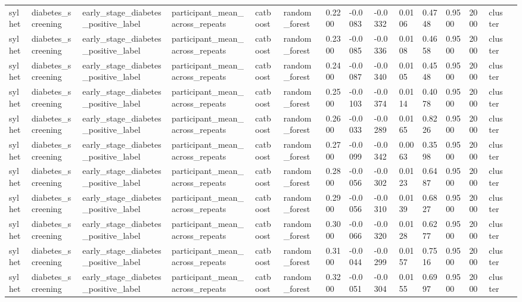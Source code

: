 \begin{tabular}{lllllllllllllll}
sylhet & diabetes\_screening & early\_stage\_diabetes\_positive\_label & participant\_mean\_across\_repeats & catboost & random\_forest & 0.2200 & -0.0083 & -0.0332 & 0.0106 & 0.4748 & 0.9500 & 2000 & cluster &  \\
sylhet & diabetes\_screening & early\_stage\_diabetes\_positive\_label & participant\_mean\_across\_repeats & catboost & random\_forest & 0.2300 & -0.0085 & -0.0336 & 0.0108 & 0.4658 & 0.9500 & 2000 & cluster &  \\
sylhet & diabetes\_screening & early\_stage\_diabetes\_positive\_label & participant\_mean\_across\_repeats & catboost & random\_forest & 0.2400 & -0.0087 & -0.0340 & 0.0105 & 0.4548 & 0.9500 & 2000 & cluster &  \\
sylhet & diabetes\_screening & early\_stage\_diabetes\_positive\_label & participant\_mean\_across\_repeats & catboost & random\_forest & 0.2500 & -0.0103 & -0.0374 & 0.0114 & 0.4078 & 0.9500 & 2000 & cluster &  \\
sylhet & diabetes\_screening & early\_stage\_diabetes\_positive\_label & participant\_mean\_across\_repeats & catboost & random\_forest & 0.2600 & -0.0033 & -0.0289 & 0.0165 & 0.8226 & 0.9500 & 2000 & cluster &  \\
sylhet & diabetes\_screening & early\_stage\_diabetes\_positive\_label & participant\_mean\_across\_repeats & catboost & random\_forest & 0.2700 & -0.0099 & -0.0342 & 0.0063 & 0.3598 & 0.9500 & 2000 & cluster &  \\
sylhet & diabetes\_screening & early\_stage\_diabetes\_positive\_label & participant\_mean\_across\_repeats & catboost & random\_forest & 0.2800 & -0.0056 & -0.0302 & 0.0123 & 0.6487 & 0.9500 & 2000 & cluster &  \\
sylhet & diabetes\_screening & early\_stage\_diabetes\_positive\_label & participant\_mean\_across\_repeats & catboost & random\_forest & 0.2900 & -0.0056 & -0.0310 & 0.0139 & 0.6827 & 0.9500 & 2000 & cluster &  \\
sylhet & diabetes\_screening & early\_stage\_diabetes\_positive\_label & participant\_mean\_across\_repeats & catboost & random\_forest & 0.3000 & -0.0066 & -0.0320 & 0.0128 & 0.6277 & 0.9500 & 2000 & cluster &  \\
sylhet & diabetes\_screening & early\_stage\_diabetes\_positive\_label & participant\_mean\_across\_repeats & catboost & random\_forest & 0.3100 & -0.0044 & -0.0299 & 0.0157 & 0.7516 & 0.9500 & 2000 & cluster &  \\
sylhet & diabetes\_screening & early\_stage\_diabetes\_positive\_label & participant\_mean\_across\_repeats & catboost & random\_forest & 0.3200 & -0.0051 & -0.0304 & 0.0155 & 0.6997 & 0.9500 & 2000 & cluster &  \\

\end{tabular}
